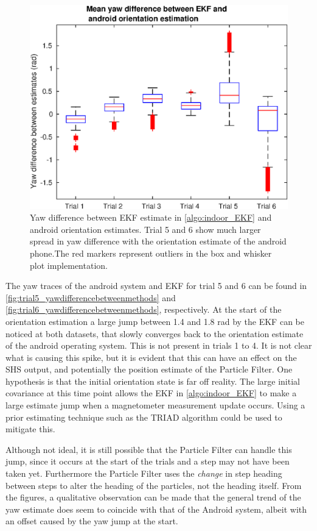 \begin{figure}[H]
	\centering
	\includegraphics[width=0.7\linewidth]{images/20201201_1212_Mean_yaw_difference_between_EKF_android_1}
	\setlength{\belowcaptionskip}{-10pt}
	\caption{Yaw difference between EKF estimate in \cref{algo:indoor_EKF} and android orientation estimates. Trial 5 and 6 show much larger spread in yaw difference with the orientation estimate of the android phone.The red markers represent outliers in the box and whisker plot implementation.}
	\label{fig:yaw_difference_between_android_and_ekf_1}
\end{figure}

The yaw traces of the android system and EKF for trial 5 and 6 can be found in \cref{fig:trial5_yawdifferencebetweenmethods} and \cref{fig:trial6_yawdifferencebetweenmethods}, respectively. At the start of the orientation estimation a large jump between 1.4 and 1.8 rad by the EKF can be noticed at both datasets, that slowly converges back to the orientation estimate of the android operating system. This is not present in trials 1 to 4. It is not clear what is causing this spike, but it is evident that this can have an effect on the SHS output, and potentially the position estimate of the Particle Filter. One hypothesis is that the initial orientation state is far off reality. The large initial covariance at this time point allows the EKF in \cref{algo:indoor_EKF} to make a large estimate jump when a magnetometer measurement update occurs. Using a prior estimating technique such as the TRIAD algorithm \cite{Kok2017} could be used to mitigate this. \par 

Although not ideal, it is still possible that the Particle Filter can handle this jump, since it occurs at the start of the trials and a step may not have been taken yet. Furthermore the Particle Filter uses the \textit{change} in step heading between steps to alter the heading of the particles, not the heading itself. From the figures, a qualitative observation can be made that the general trend of the yaw estimate does seem to coincide with that of the Android system, albeit with an offset caused by the yaw jump at the start. \par 

